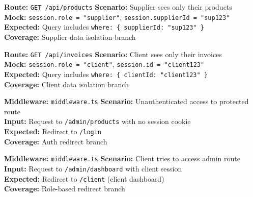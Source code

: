 ﻿\documentclass[12pt,a4paper]{report}
\newcommand{\pone}{\textbf{\color{p1red}P1}}
\begin{document}
\begin{tcolorbox}[criticalbox,title={RBAC-002 \hfill \pone\ --- Supplier Data Isolation}]
\textbf{Route:} \texttt{GET /api/products} \quad \textbf{Scenario:} Supplier sees only their products \\
\textbf{Mock:} \texttt{session.role = "supplier"}, \texttt{session.supplierId = "sup123"} \\
\textbf{Expected:} Query includes \texttt{where: \{ supplierId: "sup123" \}} \\
\textbf{Coverage:} Supplier data isolation branch
\end{tcolorbox}

\begin{tcolorbox}[criticalbox,title={RBAC-003 \hfill \pone\ --- Client Data Isolation}]
\textbf{Route:} \texttt{GET /api/invoices} \quad \textbf{Scenario:} Client sees only their invoices \\
\textbf{Mock:} \texttt{session.role = "client"}, \texttt{session.id = "client123"} \\
\textbf{Expected:} Query includes \texttt{where: \{ clientId: "client123" \}} \\
\textbf{Coverage:} Client data isolation branch
\end{tcolorbox}

\begin{tcolorbox}[criticalbox,title={RBAC-004 \hfill \pone\ --- Middleware Redirect}]
\textbf{Middleware:} \texttt{middleware.ts} \quad \textbf{Scenario:} Unauthenticated access to protected route \\
\textbf{Input:} Request to \texttt{/admin/products} with no session cookie \\
\textbf{Expected:} Redirect to \texttt{/login} \\
\textbf{Coverage:} Auth redirect branch
\end{tcolorbox}

\begin{tcolorbox}[criticalbox,title={RBAC-005 \hfill \pone\ --- Role Mismatch Redirect}]
\textbf{Middleware:} \texttt{middleware.ts} \quad \textbf{Scenario:} Client tries to access admin route \\
\textbf{Input:} Request to \texttt{/admin/dashboard} with client session \\
\textbf{Expected:} Redirect to \texttt{/client} (client dashboard) \\
\textbf{Coverage:} Role-based redirect branch
\end{tcolorbox}
\end{document}
